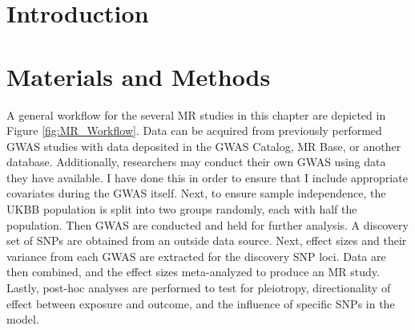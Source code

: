 \documentclass[journal,article,submit,moreauthors,pdftex]{Definitions/mdpi}
\begin{document}


\section{Introduction}



\section{Materials and Methods}
A general workflow for the several MR studies in this chapter are depicted in Figure \ref{fig:MR_Workflow}. Data can be acquired from previously performed GWAS studies with data deposited in the GWAS Catalog, MR Base, or another database. Additionally, researchers may conduct their own GWAS using data they have available. I have done this in order to ensure that I include appropriate covariates during the GWAS itself. Next, to ensure sample independence, the UKBB population is split into two groups randomly, each with half the population. Then GWAS are conducted and held for further analysis. A discovery set of SNPs are obtained from an outside data source. Next, effect sizes and their variance from each GWAS are extracted for the discovery SNP loci. Data are then combined, and the effect sizes meta-analyzed to produce an MR study. Lastly, post-hoc analyses are performed to test for pleiotropy, directionality of effect between exposure and outcome, and the influence of specific SNPs in the model.
\end{document}
